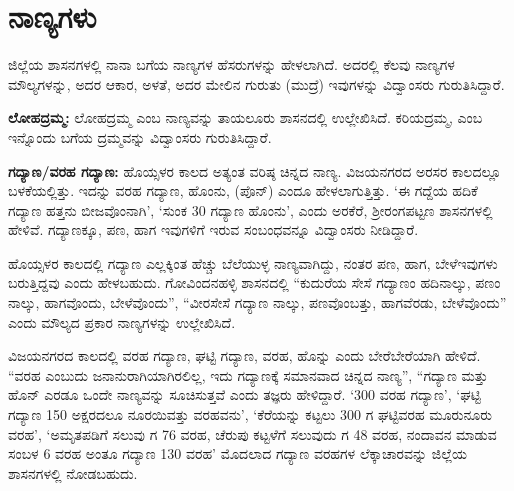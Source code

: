 \section*{ನಾಣ್ಯಗಳು}

ಜಿಲ್ಲೆಯ ಶಾಸನಗಳಲ್ಲಿ ನಾನಾ ಬಗೆಯ ನಾಣ್ಯಗಳ ಹೆಸರುಗಳನ್ನು ಹೇಳಲಾಗಿದೆ. ಅದರಲ್ಲಿ ಕೆಲವು ನಾಣ್ಯಗಳ ಮೌಲ್ಯಗಳನ್ನು, ಅದರ ಆಕಾರ, ಅಳತೆ, ಅದರ ಮೇಲಿನ ಗುರುತು (ಮುದ್ರೆ) ಇವುಗಳನ್ನು ವಿದ್ವಾಂಸರು ಗುರುತಿಸಿದ್ದಾರೆ.

\textbf{ಲೋಹದ್ರಮ್ಮ:} ಲೋಹದ್ರಮ್ಮ ಎಂಬ ನಾಣ್ಯವನ್ನು ತಾಯಲೂರು ಶಾಸನದಲ್ಲಿ ಉಲ್ಲೇಖಿಸಿದೆ. ಕರಿಯದ್ರಮ್ಮ, ಎಂಬ ಇನ್ನೊಂದು ಬಗೆಯ ದ್ರಮ್ಮವನ್ನು ವಿದ್ವಾಂಸರು ಗುರುತಿಸಿದ್ದಾರೆ.

\textbf{ಗದ್ಯಾಣ/ವರಹ ಗದ್ಯಾಣ: } ಹೊಯ್ಸಳರ ಕಾಲದ ಅತ್ಯಂತ ವರಿಷ್ಠ ಚಿನ್ನದ ನಾಣ್ಯ. ವಿಜಯನಗರದ ಅರಸರ ಕಾಲದಲ್ಲೂ ಬಳಕೆಯಲ್ಲಿತ್ತು. ಇದನ್ನು ವರಹ ಗದ್ಯಾಣ, ಹೊಂನು, (ಪೊನ್​) ಎಂದೂ ಹೇಳಲಾಗುತ್ತಿತ್ತು. ‘ಈ ಗದ್ದೆಯ ಹದಿಕೆ ಗದ್ಯಾಣ ಹತ್ತನು ಬೀಜವೊಂನಾಗಿ’, ‘ಸುಂಕ 30 ಗದ್ಯಾಣ ಹೊಂನು’, ಎಂದು ಅರಕೆರೆ, ಶ‍್ರೀರಂಗಪಟ್ಟಣ ಶಾಸನಗಳಲ್ಲಿ ಹೇಳಿವೆ. ಗದ್ಯಾಣಕ್ಕೂ, ಪಣ, ಹಾಗ ಇವುಗಳಿಗೆ ಇರುವ ಸಂಬಂಧವನ್ನೂ ವಿದ್ವಾಂಸರು ನೀಡಿದ್ದಾರೆ.

ಹೊಯ್ಸಳರ ಕಾಲದಲ್ಲಿ ಗದ್ಯಾಣ ಎಲ್ಲಕ್ಕಿಂತ ಹೆಚ್ಚು ಬೆಲೆಯುಳ್ಳ ನಾಣ್ಯವಾಗಿದ್ದು, ನಂತರ ಪಣ, ಹಾಗ, ಬೇಳೆ\break ಇವುಗಳು ಬರುತ್ತಿದ್ದವು ಎಂದು ಹೇಳಬಹುದು. ಗೋವಿಂದನಹಳ್ಳಿ ಶಾಸನದಲ್ಲಿ “ಕುದುರೆಯ ಸೇಸೆ ಗದ್ಯಾಣಂ ಹದಿನಾಲ್ಕು, ಪಣಂ ನಾಲ್ಕು, ಹಾಗವೊಂದು, ಬೇಳೆವೊಂದು”, “ವೀರಸೇಸೆ ಗದ್ಯಾಣ ನಾಲ್ಕು, ಪಣವೊಂಬತ್ತು, ಹಾಗವೆರಡು, ಬೇಳೆವೊಂದು” ಎಂದು ಮೌಲ್ಯದ ಪ್ರಕಾರ ನಾಣ್ಯಗಳನ್ನು ಉಲ್ಲೇಖಿಸಿದೆ.

ವಿಜಯನಗರದ ಕಾಲದಲ್ಲಿ ವರಹ ಗದ್ಯಾಣ, ಘಟ್ಟಿ ಗದ್ಯಾಣ, ವರಹ, ಹೊನ್ನು ಎಂದು ಬೇರೆಬೇರೆಯಾಗಿ ಹೇಳಿದೆ. “ವರಹ ಎಂಬುದು ಜನಾನುರಾಗಿಯಾಗಿರಲಿಲ್ಲ, ಇದು ಗದ್ಯಾಣಕ್ಕೆ ಸಮಾನವಾದ ಚಿನ್ನದ ನಾಣ್ಯ”, “ಗದ್ಯಾಣ ಮತ್ತು ಹೊನ್​ ಎರಡೂ ಒಂದೇ ನಾಣ್ಯವನ್ನು ಸೂಚಿಸುತ್ತವೆ ಎಂದು ತಜ್ಞರು ಹೇಳಿದ್ದಾರೆ. ‘300 ವರಹ ಗದ್ಯಾಣ’, ‘ಘಟ್ಟಿ ಗದ್ಯಾಣ 150 ಅಕ್ಷರದಲೂ ನೂರಯಿವತ್ತು ವರಹವನು’, ‘ಕೆರೆಯನ್ನು ಕಟ್ಟಲು 300 ಗ ಘಟ್ಟಿವರಹ ಮೂರುನೂರು ವರಹ’, ‘ಅಮೃತಪಡಿಗೆ ಸಲುವು ಗ 76 ವರಹ, ಚೆರುಪು ಕಟ್ಟಳೆಗೆ ಸಲುವುದು ಗ 48 ವರಹ, ನಂದಾವನ ಮಾಡುವ ಸಂಬಳ 6 ವರಹ ಅಂತೂ ಗದ್ಯಾಣ 130 ವರಹ’ ಮೊದಲಾದ ಗದ್ಯಾಣ ವರಹಗಳ ಲೆಕ್ಕಾಚಾರವನ್ನು ಜಿಲ್ಲೆಯ ಶಾಸನಗಳಲ್ಲಿ ನೋಡಬಹುದು.

